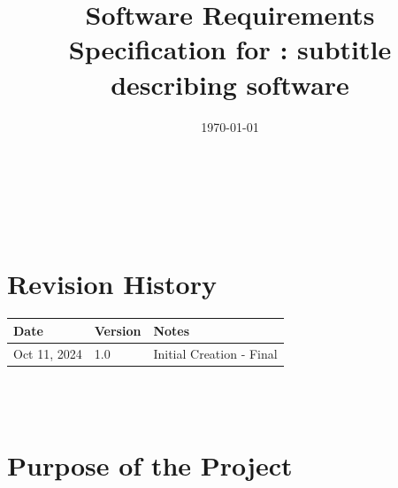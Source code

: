 \documentclass[12pt]{article}
\begin{document}
\title{Software Requirements Specification for \progname: subtitle describing software} 
\author{\authname}
\date{\today}
	
\maketitle

~\newpage


\tableofcontents

~\newpage

\section*{Revision History}

\begin{tabularx}{\textwidth}{p{3cm}p{2cm}X}
\toprule {\textbf{Date}} & {\textbf{Version}} & {\textbf{Notes}}\\
\midrule
Oct 11, 2024 & 1.0 & Initial Creation - Final\\
\bottomrule
\end{tabularx}

~\\

~\newpage
\section{Purpose of the Project}
\end{document}
